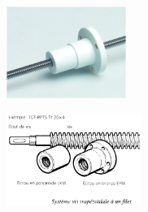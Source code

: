 \documentclass[11pt,oneside]{article}
\begin{document}
\begin{minipage}[c]{.45\linewidth}
\begin{center}
\includegraphics[height=3cm]{png/fig_95}
\end{center}
\end{minipage} \hfill
\begin{minipage}[c]{.45\linewidth}
\begin{center}
\includegraphics[height=3cm]{png/fig_96}
\end{center}
\end{minipage}
\end{document}
